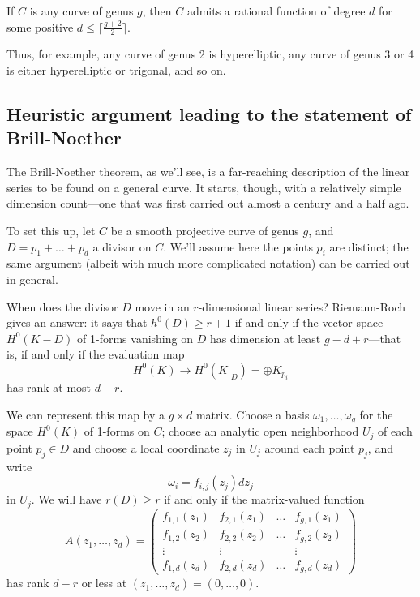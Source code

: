 \begin{corollary}
If $C$ is any curve of genus $g$, then $C$ admits a rational function of degree $d$ for some positive $d \leq \lceil \frac{g+2}{2}\rceil$.
\end{corollary}

Thus, for example, any curve of genus 2 is hyperelliptic, any curve of genus 3 or 4 is either hyperelliptic or trigonal, and so on.

\subsection{Heuristic argument leading to the statement of Brill-Noether}

The Brill-Noether theorem, as we'll see, is a far-reaching description of the linear series to be found on a general curve. It starts, though, with a relatively simple dimension count---one that was first carried out almost a century and a half ago.

To set this up, let $C$ be a smooth projective curve of genus $g$, and $D = p_1 + \dots + p_d$ a divisor on $C$. We'll assume here the points $p_i$ are distinct; the same argument (albeit with much more complicated notation) can be carried out in general.

When does the divisor $D$ move in an $r$-dimensional linear series? Riemann-Roch gives an answer: it says that $h^0(D) \geq r+1$ if and only if the vector space $H^0(K-D)$ of 1-forms vanishing on $D$ has dimension at least $g-d+r$---that is, if and only if the  evaluation map
$$
H^0(K) \to H^0(K|_D) = \oplus K_{p_i}
$$
has rank at most $d-r$. 

We can represent this map by a $g \times d$ matrix. Choose a basis $\omega_1,\dots,\omega_g$ for the space $H^0(K)$ of 1-forms on $C$; choose an analytic open neighborhood $U_j$ of each point $p_j \in D$ and choose a local coordinate $z_j$ in $U_j$ around each point $p_j$, and write
$$
\omega_i = f_{i,j}(z_j)dz_j
$$
in $U_j$. We will have $r(D) \geq r$ if and only if the  matrix-valued function
$$
A(z_1,\dots,z_d) = 
\begin{pmatrix}
f_{1,1}(z_1) & f_{2,1}(z_1) & \dots & f_{g,1}(z_1) \\
f_{1,2}(z_2) & f_{2,2}(z_2) & \dots & f_{g,2}(z_2) \\
\vdots & \vdots &  & \vdots \\
f_{1,d}(z_d) & f_{2,d}(z_d) & \dots & f_{g,d} (z_d)
\end{pmatrix}
$$
has rank $d-r$ or less at $(z_1,\dots,z_d) = (0,\dots,0)$.

